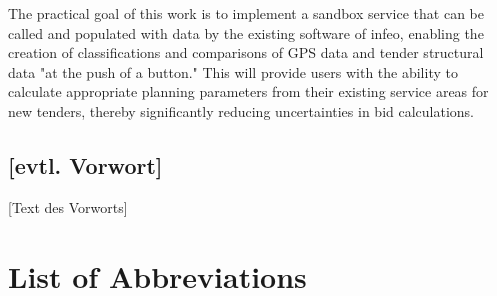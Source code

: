 \documentclass[a4paper,12pt,twoside]{scrreprt}
\begin{document}
The practical goal of this work is to implement a sandbox service that can be called and populated with data by the existing software of infeo, enabling the creation of classifications and comparisons of GPS data and tender structural data "at the push of a button." This will provide users with the ability to calculate appropriate planning parameters from their existing service areas for new tenders, thereby significantly reducing uncertainties in bid calculations.
\vspace{0.5cm}


\newpage
\section*{[evtl. Vorwort]}   %

[Text des Vorworts]


\cleardoublepage   %
\tableofcontents

\clearpage
{}
{}
\listoffigures

\clearpage
{}
{}
\listoftables

\clearpage
{}
{}  %
\chapter*{List of Abbreviations} %
\begin{acronym}[SQL]
\end{acronym}

\end{document}
